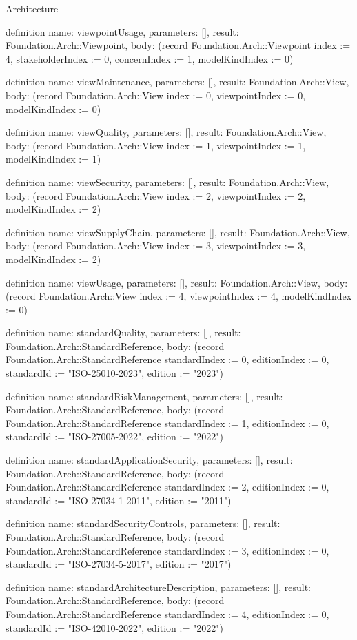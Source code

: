 \begin{lexlean}{Architecture}
\begin{semanticmodule}
definition{
  name: viewpointUsage,
  parameters: [],
  result: Foundation.Arch::Viewpoint,
  body: (record Foundation.Arch::Viewpoint {index := 4, stakeholderIndex := 0, concernIndex := 1, modelKindIndex := 0})
}

definition{
  name: viewMaintenance,
  parameters: [],
  result: Foundation.Arch::View,
  body: (record Foundation.Arch::View {index := 0, viewpointIndex := 0, modelKindIndex := 0})
}

definition{
  name: viewQuality,
  parameters: [],
  result: Foundation.Arch::View,
  body: (record Foundation.Arch::View {index := 1, viewpointIndex := 1, modelKindIndex := 1})
}

definition{
  name: viewSecurity,
  parameters: [],
  result: Foundation.Arch::View,
  body: (record Foundation.Arch::View {index := 2, viewpointIndex := 2, modelKindIndex := 2})
}

definition{
  name: viewSupplyChain,
  parameters: [],
  result: Foundation.Arch::View,
  body: (record Foundation.Arch::View {index := 3, viewpointIndex := 3, modelKindIndex := 2})
}

definition{
  name: viewUsage,
  parameters: [],
  result: Foundation.Arch::View,
  body: (record Foundation.Arch::View {index := 4, viewpointIndex := 4, modelKindIndex := 0})
}

definition{
  name: standardQuality,
  parameters: [],
  result: Foundation.Arch::StandardReference,
  body: (record Foundation.Arch::StandardReference {standardIndex := 0, editionIndex := 0, standardId := "ISO-25010-2023", edition := "2023"})
}

definition{
  name: standardRiskManagement,
  parameters: [],
  result: Foundation.Arch::StandardReference,
  body: (record Foundation.Arch::StandardReference {standardIndex := 1, editionIndex := 0, standardId := "ISO-27005-2022", edition := "2022"})
}

definition{
  name: standardApplicationSecurity,
  parameters: [],
  result: Foundation.Arch::StandardReference,
  body: (record Foundation.Arch::StandardReference {standardIndex := 2, editionIndex := 0, standardId := "ISO-27034-1-2011", edition := "2011"})
}

definition{
  name: standardSecurityControls,
  parameters: [],
  result: Foundation.Arch::StandardReference,
  body: (record Foundation.Arch::StandardReference {standardIndex := 3, editionIndex := 0, standardId := "ISO-27034-5-2017", edition := "2017"})
}

definition{
  name: standardArchitectureDescription,
  parameters: [],
  result: Foundation.Arch::StandardReference,
  body: (record Foundation.Arch::StandardReference {standardIndex := 4, editionIndex := 0, standardId := "ISO-42010-2022", edition := "2022"})
}
\end{semanticmodule}
\end{lexlean}
